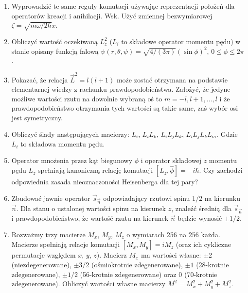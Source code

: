 \documentclass[a4paper,11pt]{article}
\begin{document}
\begin{enumerate}
\item Wyprowadzić te same reguły komutacji używając reprezentacji
  położeń dla operatorów kreacji i anihilacji. Wsk. Użyć zmiennej
  bezwymiarowej $\zeta = \sqrt{ m \omega / 2 \hbar } x$.

\item Obliczyć wartość oczekiwaną $L_{ z }^{ 2 }$ ($L_{ i }$ to
  składowe operator momentu pędu) w stanie opisany funkcją falową
  $\psi( r, \theta, \psi ) = \sqrt{ 4 / ( 3 \pi ) } ( \sin \phi )^{ 2
  }$, $0 \leq \phi \leq 2\pi$.

\item Pokazać, że relacja $\vec{ L }^{ 2 } = l ( l + 1 )$ może zostać
  otrzymana na podstawie elementarnej wiedzy z rachunku
  prawdopodobieństwa. Założyć, że jedyne możliwe wartości rzutu na
  dowolnie wybraną oś to $m = -l, l + 1, \ldots, l$ i że
  prawdopodobieństwo otrzymania tych wartości są takie same, zaś wybór
  osi jest symetryczny.

\item Obliczyć ślady następujących macierzy: $L_{ i }$,
  $L_{ i } L_{ k }$, $L_{ i } L_{ j } L_{ k }$,
  $L_{ i } L_{ j } L_{ k } L_{ m }$. Gdzie $L_{ i }$ to składowa
  momentu pędu.

\item Operator mnożenia przez kąt biegunowy $\phi$ i operator
  składowej $z$ momentu pędu $L_{ z }$ spełniają kanoniczną relację
  komutacji $[ L_{ z }, \widehat{ \phi } ] = -i\hbar$. Czy zachodzi
  odpowiednia zasada nieoznaczoności Heisenberga dla tej pary?

\item Zbudować jawnie operator $\vec{ s }_{ \vec{ n } }$ odpowiadający
  rzutowi spinu $1 / 2$ na kierunku $\vec{ n }$. Dla stanu o ustalonej
  wartości spinu na kierunek $z$, znaleźć średnią dla
  $\vec{ s }_{ \vec{ n } }$ i prawdopodobieństwo, że wartość rzutu na
  kierunek $\vec{ n }$ będzie wynosić $\pm 1 / 2$.

\item Rozważmy trzy macierze $M_{ x }$, $M_{ y }$, $M_{ z }$ o
  wymiarach 256 na 256 każda. Macierze spełniają relacje komutacji
  $[ M_{ x }, M_{ y } ] = i M_{ z }$ (oraz ich cykliczne permutacje
  względem $x$, $y$, $z$). Macierz $M_{ x }$ ma wartości własne:
  $\pm 2$ (niezdegenerowane), $\pm 3 / 2$ (ośmiokrotnie
  zdegenerowane), $\pm 1$ (28-krotnie zdegenerowane), $\pm 1 / 2$
  (56-krotnie zdegenerowane) oraz 0 (70-krotnie zdegenerowane).
  Obliczyć wartości własne macierzy
  $M^{ 2 } = M_{ x }^{ 2 } + M_{ y }^{ 2 } + M_{ z }^{ 2 }$.


\end{enumerate}
\end{document}
